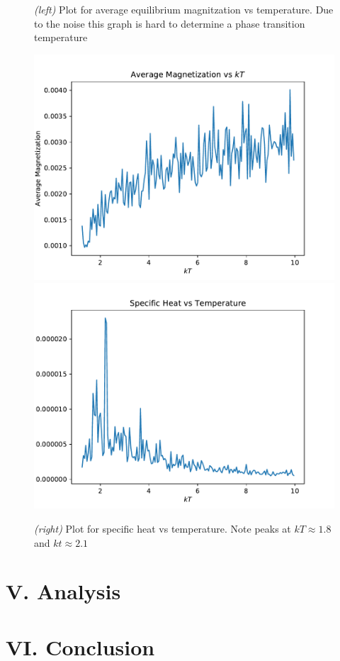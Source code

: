 \documentclass{article}
\begin{document}
\begin{figure}[H]
  \caption{\textit{(left)} Plot for average equilibrium magnitzation vs temperature.
  Due to the noise this graph is hard to determine a phase transition temperature}
  \includegraphics[scale=0.35]{d_mags.pdf}
  \includegraphics[scale=0.35]{d_cv.pdf}
  \caption{\textit{(right)} Plot for specific heat vs temperature. Note peaks at
  $kT \approx 1.8 $ and $kt \approx 2.1$}
\end{figure}
\section*{V. Analysis}
\indent \indent 
\section*{VI. Conclusion}
\end{document}
